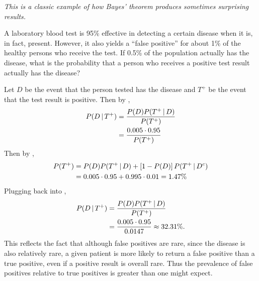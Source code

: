 \begin{changebar}
    \begin{example}
        \emph{This is a classic example of how Bayes' theorem produces sometimes surprising results.}

        A laboratory blood test is 95\% effective in detecting a certain disease when it is, in fact, present. However, it also yields a ``false positive'' for about 1\% of the healthy persons who receive the test. If 0.5\% of the population actually has the disease, what is the probability that a person who receives a positive test result actually has the disease? 
    \end{example}
    \begin{solution}
        Let $D$ be the event that the person tested has the disease and $T^+$ be the event that the test result is positive. Then by , \[
            \begin{aligned}
                P(D \,\vert\, T^+) &= \frac{P(D)P(T^+ \,\vert\, D)}{P(T^+)} \\
                &= \frac{0.005\cdot 0.95}{P(T^+)}
            \end{aligned}
        \] Then by , \[
            \begin{aligned}
                P(T^+) &= P(D)P(T^+ \,\vert\, D) + \left[ 1 - P(D) \right]P(T^+ \,\vert\, D^c) \\
                &= 0.005\cdot 0.95 + 0.995\cdot 0.01 = 1.47\% 
            \end{aligned}
        \] Plugging back into , \[
            \begin{aligned}
                P(D \,\vert\, T^+) &= \frac{P(D)P(T^+ \,\vert\, D)}{P(T^+)} \\
                &= \frac{0.005\cdot 0.95}{0.0147} \approx 32.31\%.
            \end{aligned}
        \] This reflects the fact that although false positives are rare, since the disease is also relatively rare, a given patient is more likely to return a false positive than a true positive, even if a positive result is overall rare. Thus the prevalence of false positives relative to true positives is greater than one might expect.
    \end{solution}
\end{changebar}

